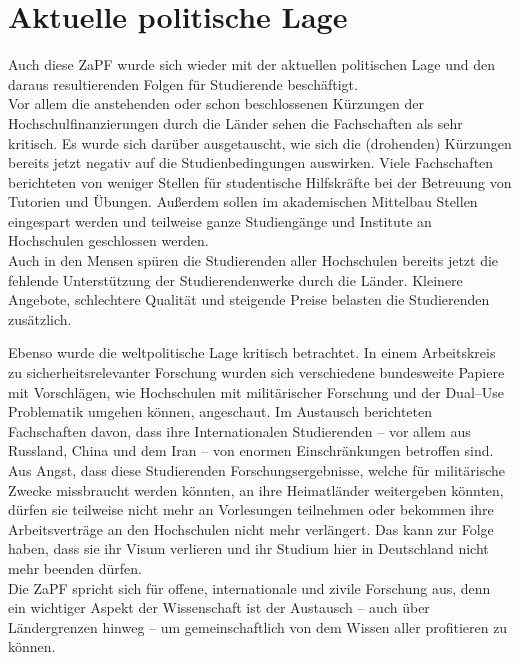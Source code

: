 \documentclass[DIV=calc]{scrartcl}
\begin{document}
\section*{Aktuelle politische Lage}

Auch diese ZaPF wurde sich wieder mit der aktuellen politischen Lage und den daraus resultierenden Folgen für Studierende beschäftigt. \\
Vor allem die anstehenden oder schon beschlossenen Kürzungen der Hochschulfinanzierungen durch die Länder sehen die Fachschaften als sehr kritisch. Es wurde sich darüber ausgetauscht, wie sich die (drohenden) Kürzungen bereits jetzt negativ auf die Studienbedingungen auswirken. Viele Fachschaften berichteten von weniger Stellen für studentische Hilfskräfte bei der Betreuung von Tutorien und Übungen. Außerdem sollen im akademischen Mittelbau Stellen eingespart werden und teilweise ganze Studiengänge und Institute an Hochschulen geschlossen werden.\\
Auch in den Mensen spüren die Studierenden aller Hochschulen bereits jetzt die fehlende Unterstützung der Studierendenwerke durch die Länder. Kleinere Angebote, schlechtere Qualität und steigende Preise belasten die Studierenden zusätzlich.

Ebenso wurde die weltpolitische Lage kritisch betrachtet. In einem Arbeitskreis zu sicherheitsrelevanter Forschung wurden sich verschiedene bundesweite Papiere mit Vorschlägen, wie Hochschulen mit militärischer Forschung und der Dual–Use Problematik umgehen können, angeschaut. Im Austausch berichteten Fachschaften davon, dass ihre Internationalen Studierenden – vor allem aus Russland, China und dem Iran – von enormen Einschränkungen betroffen sind. Aus Angst, dass diese Studierenden Forschungsergebnisse, welche für militärische Zwecke missbraucht werden könnten, an ihre Heimatländer weitergeben könnten, dürfen sie teilweise nicht mehr an Vorlesungen teilnehmen oder bekommen ihre Arbeitsverträge an den Hochschulen nicht mehr verlängert. Das kann zur Folge haben, dass sie ihr Visum verlieren und ihr Studium hier in Deutschland nicht mehr beenden dürfen.\\
Die ZaPF spricht sich für offene, internationale und zivile Forschung aus, denn ein wichtiger Aspekt der Wissenschaft ist der Austausch – auch über Ländergrenzen hinweg – um gemeinschaftlich von dem Wissen aller profitieren zu können.
\end{document}
